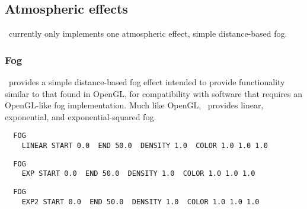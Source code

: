 
\subsection{Atmospheric effects}
\RAY\ currently only implements one atmospheric effect, 
simple distance-based fog.

\subsubsection{Fog}
\RAY\ provides a simple distance-based fog effect intended to provide
functionality similar to that found in OpenGL, for compatibility with
software that requires an OpenGL-like fog implementation.  Much like
OpenGL, \RAY\ provides linear, exponential, and exponential-squared fog.

\begin{verbatim}
  FOG 
    LINEAR START 0.0  END 50.0  DENSITY 1.0  COLOR 1.0 1.0 1.0
\end{verbatim}

\begin{verbatim}
  FOG 
    EXP START 0.0  END 50.0  DENSITY 1.0  COLOR 1.0 1.0 1.0
\end{verbatim}

\begin{verbatim}
  FOG 
    EXP2 START 0.0  END 50.0  DENSITY 1.0  COLOR 1.0 1.0 1.0
\end{verbatim}



